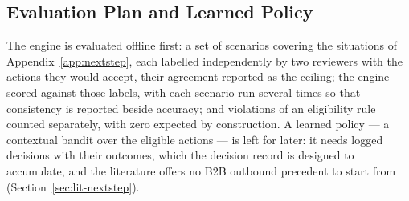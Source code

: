 \documentclass[a4paper]{article}
\begin{document}
\subsection{Evaluation Plan and Learned Policy}
\label{app:nextstep-eval}

The engine is evaluated offline first: a set of
scenarios covering the situations of Appendix~\ref{app:nextstep}, each
labelled independently by two reviewers with the actions they would accept,
their agreement reported as the ceiling; the engine scored against those
labels, with each scenario run several times so that consistency is reported
beside accuracy; and violations of an eligibility rule counted separately,
with zero expected by construction. A learned policy --- a contextual bandit
over the eligible actions --- is left for later: it needs logged decisions
with their outcomes, which the decision record is designed to accumulate,
and the literature offers no B2B outbound precedent to start from
(Section~\ref{sec:lit-nextstep}).
\end{document}
